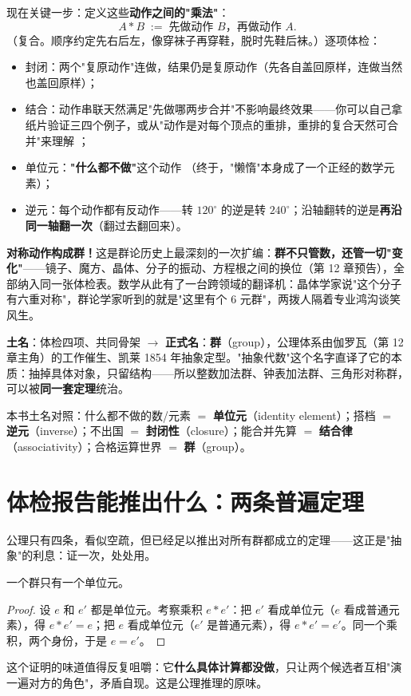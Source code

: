 现在关键一步：定义这些\textbf{动作之间的"乘法"}：
\[
A * B \;:=\; \text{先做动作 } B\text{，再做动作 } A .
\]
（复合。顺序约定先右后左，像穿袜子再穿鞋，脱时先鞋后袜。）逐项体检：
\begin{itemize}
\item 封闭：两个"复原动作"连做，结果仍是复原动作（先各自盖回原样，连做当然也盖回原样）\checkmark；
\item 结合：动作串联天然满足"先做哪两步合并"不影响最终效果——你可以自己拿纸片验证三四个例子，或从"动作是对每个顶点的重排，重排的复合天然可合并"来理解 \checkmark；
\item 单位元：\textbf{"什么都不做"}这个动作 \checkmark（终于，"懒惰"本身成了一个正经的数学元素）；
\item 逆元：每个动作都有反动作——转 $120^\circ$ 的逆是转 $240^\circ$；沿轴翻转的逆是\textbf{再沿同一轴翻一次}（翻过去翻回来）\checkmark。
\end{itemize}
\textbf{对称动作构成群！}这是群论历史上最深刻的一次扩编：\textbf{群不只管数，还管一切"变化"}——镜子、魔方、晶体、分子的振动、方程根之间的换位（第 12 章预告），全部纳入同一张体检表。数学从此有了一台跨领域的翻译机：晶体学家说"这个分子有六重对称"，群论学家听到的就是"这里有个 6 元群"，两拨人隔着专业鸿沟谈笑风生。

\begin{faming}
\textbf{土名}：体检四项、共同骨架 $\to$ \textbf{正式名}：\textbf{群}（group），公理体系由伽罗瓦（第 12 章主角）的工作催生、凯莱 1854 年抽象定型。"抽象代数"这个名字直译了它的本质：抽掉具体对象，只留结构——所以整数加法群、钟表加法群、三角形对称群，可以被\textbf{同一套定理}统治。
\end{faming}

\begin{cidian}
本书土名对照：什么都不做的数/元素 $=$ \textbf{单位元}（identity element）；搭档 $=$ \textbf{逆元}（inverse）；不出国 $=$ \textbf{封闭性}（closure）；能合并先算 $=$ \textbf{结合律}（associativity）；合格运算世界 $=$ \textbf{群}（group）。
\end{cidian}

\section{体检报告能推出什么：两条普遍定理}

公理只有四条，看似空疏，但已经足以推出对所有群都成立的定理——这正是"抽象"的利息：证一次，处处用。

\begin{dingli}[单位元唯一]
一个群只有一个单位元。
\end{dingli}
\begin{proof}
设 $e$ 和 $e'$ 都是单位元。考察乘积 $e * e'$：把 $e'$ 看成单位元（$e$ 看成普通元素），得 $e*e' = e$；把 $e$ 看成单位元（$e'$ 是普通元素），得 $e*e' = e'$。同一个乘积，两个身份，于是 $e = e'$。
\end{proof}
这个证明的味道值得反复咀嚼：它\textbf{什么具体计算都没做}，只让两个候选者互相"演一遍对方的角色"，矛盾自现。这是公理推理的原味。

